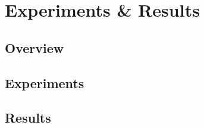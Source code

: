 \chapter{Experiments \& Results}\label{ch:results}

\section{Overview}

\section{Experiments}

\section{Results}
